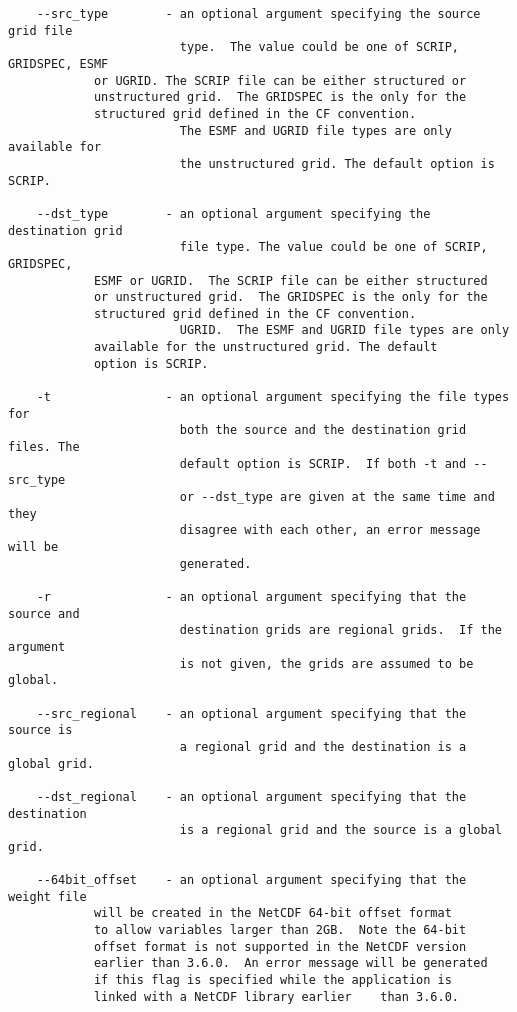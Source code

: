 \begin{verbatim}
    --src_type        - an optional argument specifying the source grid file 
                        type.  The value could be one of SCRIP, GRIDSPEC, ESMF 
			or UGRID. The SCRIP file can be either structured or
 			unstructured grid.  The GRIDSPEC is the only for the
			structured grid defined in the CF convention. 
                        The ESMF and UGRID file types are only available for 
                        the unstructured grid. The default option is SCRIP.

    --dst_type        - an optional argument specifying the destination grid 
                        file type. The value could be one of SCRIP, GRIDSPEC,
			ESMF or UGRID.  The SCRIP file can be either structured
 			or unstructured grid.  The GRIDSPEC is the only for the
			structured grid defined in the CF convention. 
                        UGRID.  The ESMF and UGRID file types are only 
			available for the unstructured grid. The default 
			option is SCRIP.

    -t                - an optional argument specifying the file types for 
                        both the source and the destination grid files. The 
                        default option is SCRIP.  If both -t and --src_type 
                        or --dst_type are given at the same time and they 
                        disagree with each other, an error message will be 
                        generated.

    -r                - an optional argument specifying that the source and 
                        destination grids are regional grids.  If the argument
                        is not given, the grids are assumed to be global.

    --src_regional    - an optional argument specifying that the source is 
                        a regional grid and the destination is a global grid.  

    --dst_regional    - an optional argument specifying that the destination 
                        is a regional grid and the source is a global grid.  

    --64bit_offset    - an optional argument specifying that the weight file 
			will be created in the NetCDF 64-bit offset format 
			to allow variables larger than 2GB.  Note the 64-bit 
			offset format is not supported in the NetCDF version 
			earlier than 3.6.0.  An error message will be generated 
			if this flag is specified while the application is 
			linked with a NetCDF library earlier	than 3.6.0.


\end{verbatim}
